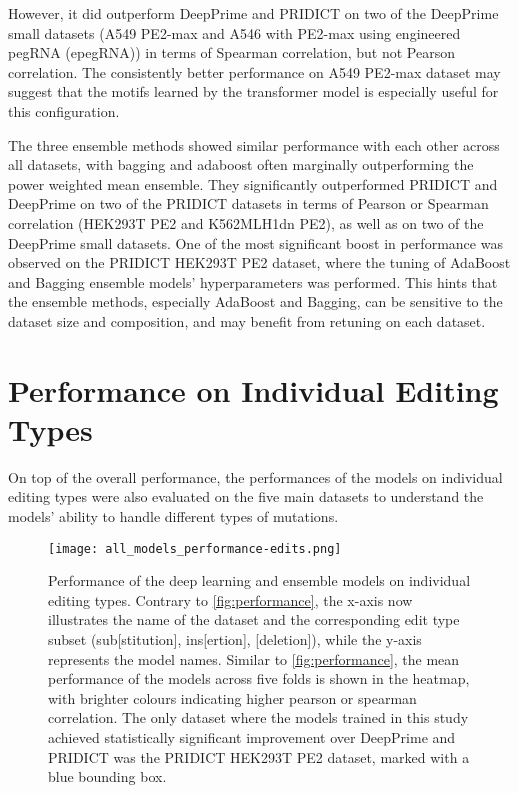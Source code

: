 However, it did outperform DeepPrime and PRIDICT on two of the DeepPrime small datasets (A549 PE2-max and A546 with PE2-max using engineered pegRNA (epegRNA)) in terms of Spearman correlation, but not Pearson correlation. The consistently better performance on A549 PE2-max dataset may suggest that the motifs learned by the transformer model is especially useful for this configuration. 

The three ensemble methods showed similar performance with each other across all datasets, with bagging and adaboost often marginally outperforming the power weighted mean ensemble. They significantly outperformed PRIDICT and DeepPrime on two of the PRIDICT datasets in terms of Pearson or Spearman correlation (HEK293T PE2 and K562MLH1dn PE2), as well as on two of the DeepPrime small datasets. One of the most significant boost in performance was observed on the PRIDICT HEK293T PE2 dataset, where the tuning of AdaBoost and Bagging ensemble models' hyperparameters was performed. This hints that the ensemble methods, especially AdaBoost and Bagging, can be sensitive to the dataset size and composition, and may benefit from retuning on each dataset.


\section{Performance on Individual Editing Types}

On top of the overall performance, the performances of the models on individual editing types were also evaluated on the five main datasets to understand the models' ability to handle different types of mutations. 

\begin{figure}
    \centering
    \texttt{[image: all\_models\_performance-edits.png]}
    \caption[Performance of the models on individual editing types]{Performance of the deep learning and ensemble models on individual editing types. Contrary to \autoref{fig:performance}, the x-axis now illustrates the name of the dataset and the corresponding edit type subset (sub[stitution], ins[ertion], [deletion]), while the y-axis represents the model names. Similar to \autoref{fig:performance}, the mean performance of the models across five folds is shown in the heatmap, with brighter colours indicating higher pearson or spearman correlation. The only dataset where the models trained in this study achieved statistically significant improvement over DeepPrime and PRIDICT was the PRIDICT HEK293T PE2 dataset, marked with a blue bounding box.}
    \label{fig:performance_edits}
\end{figure}

